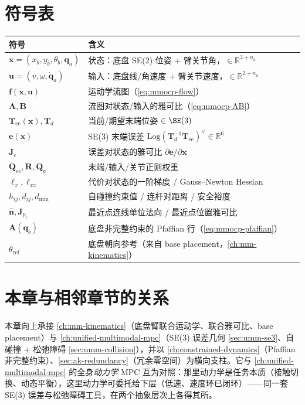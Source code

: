 \section*{符号表}

\begin{table}[H]\centering\small
\begin{tabular}{ll}
\toprule
符号 & 含义 \\
\midrule
$\mathbf x=(x_b,y_b,\theta_b,\mathbf q_a)$ & 状态：底盘 SE(2) 位姿 $+$ 臂关节角，$\in\mathbb R^{3+n_a}$ \\
$\mathbf u=(v,\omega,\dot{\mathbf q}_a)$ & 输入：底盘线/角速度 $+$ 臂关节速度，$\in\mathbb R^{2+n_a}$ \\
$\mathbf f(\mathbf x,\mathbf u)$ & 运动学流图（\cref{eq:mmocp-flow}） \\
$\mathbf A,\mathbf B$ & 流图对状态/输入的雅可比（\cref{eq:mmocp-AB}） \\
$\mathbf T_{\text{ee}}(\mathbf x),\mathbf T_d$ & 当前/期望末端位姿 $\in\SE(3)$ \\
$\mathbf e(\mathbf x)$ & SE(3) 末端误差 $\mathrm{Log}(\mathbf T_d^{-1}\mathbf T_{\text{ee}})^\vee\in\mathbb R^6$ \\
$\mathbf J_e$ & 误差对状态的雅可比 $\partial\mathbf e/\partial\mathbf x$ \\
$\mathbf Q_{\text{ee}},\mathbf R,\mathbf Q_a$ & 末端/输入/关节正则权重 \\
$\boldsymbol\ell_x,\boldsymbol\ell_{xx}$ & 代价对状态的一阶梯度 / Gauss--Newton Hessian \\
$h_{ij},d_{ij},d_{\min}$ & 自碰撞约束值 / 连杆对距离 / 安全裕度 \\
$\hat{\mathbf n},\mathbf J_{p_i}$ & 最近点连线单位法向 / 最近点位置雅可比 \\
$\mathbf A(\mathbf q_b)$ & 底盘非完整约束的 Pfaffian 行（\cref{eq:mmocp-pfaffian}） \\
$\theta_{\text{ref}}$ & 底盘朝向参考（来自 base placement，\cref{ch:mm-kinematics}） \\
\bottomrule
\end{tabular}
\end{table}

\section*{本章与相邻章节的关系}

本章向上承接 \cref{ch:mm-kinematics}（底盘臂联合运动学、联合雅可比、base placement）与 \cref{ch:unified-multimodal-mpc}（SE(3) 误差几何 \cref{sec:umm-se3}、自碰撞 $+$ 松弛障碍 \cref{sec:umm-collision}），并以 \cref{ch:constrained-dynamics}（Pfaffian 非完整约束）、\cref{sec:ak-redundancy}（冗余零空间）为横向支柱。它与 \cref{ch:unified-multimodal-mpc} 的全身\emph{动力学} MPC 互为对照：那里动力学是任务本质（接触切换、动态平衡），这里动力学可委托给下层（低速、速度环已闭环）——同一套 SE(3) 误差与松弛障碍工具，在两个抽象层次上各得其所。


